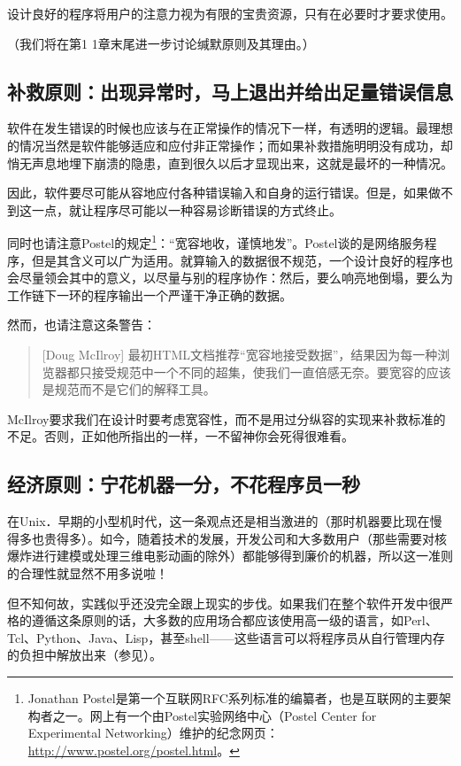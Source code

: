 \documentclass[12pt,oneside]{book}
\begin{document}
\begin{common-format}
设计良好的程序将用户的注意力视为有限的宝贵资源，只有在必要时才要求使用。

（我们将在第1 1章末尾进一步讨论缄默原则及其理由。）


\subsection{补救原则：出现异常时，马上退出并给出足量错误信息}
软件在发生错误的时候也应该与在正常操作的情况下一样，有透明的逻辑。最理想的情况当然是软件能够适应和应付非正常操作；而如果补救措施明明没有成功，却悄无声息地埋下崩溃的隐患，直到很久以后才显现出来，这就是最坏的一种情况。

因此，软件要尽可能从容地应付各种错误输入和自身的运行错误。但是，如果做不到这一点，就让程序尽可能以一种容易诊断错误的方式终止。

同时也请注意Postel的规定\footnote{Jonathan Postel是第一个互联网RFC系列标准的编纂者，也是互联网的主要架构者之一。网上有一个由Postel实验网络中心（Postel Center for Experimental Networking）维护的纪念网页：\href{http://www.postel.org/postel.html}{http://www.postel.org/postel.html}。}：“宽容地收，谨慎地发”。Postel谈的是网络服务程序，但是其含义可以广为适用。就算输入的数据很不规范，一个设计良好的程序也会尽量领会其中的意义，以尽量与别的程序协作：然后，要么响亮地倒塌，要么为工作链下一环的程序输出一个严谨干净正确的数据。

然而，也请注意这条警告：

\begin{quote}[Doug McIlroy]
最初HTML文档推荐“宽容地接受数据”，结果因为每一种浏览器都只接受规范中一个不同的超集，使我们一直倍感无奈。要宽容的应该是规范而不是它们的解释工具。
\end{quote}

McIlroy要求我们在设计时要考虑宽容性，而不是用过分纵容的实现来补救标准的不足。否则，正如他所指出的一样，一不留神你会死得很难看。

\subsection{经济原则：宁花机器一分，不花程序员一秒}
在Unix．早期的小型机时代，这一条观点还是相当激进的（那时机器要比现在慢得多也贵得多）。如今，随着技术的发展，开发公司和大多数用户（那些需要对核爆炸进行建模或处理三维电影动画的除外）都能够得到廉价的机器，所以这一准则的合理性就显然不用多说啦！

但不知何故，实践似乎还没完全跟上现实的步伐。如果我们在整个软件开发中很严格的遵循这条原则的话，大多数的应用场合都应该使用高一级的语言，如Perl、Tcl、Python、Java、Lisp，甚至shell——这些语言可以将程序员从自行管理内存的负担中解放出来（参见\cite{Ravenbrook}）。


\end{common-format}
\end{document}

